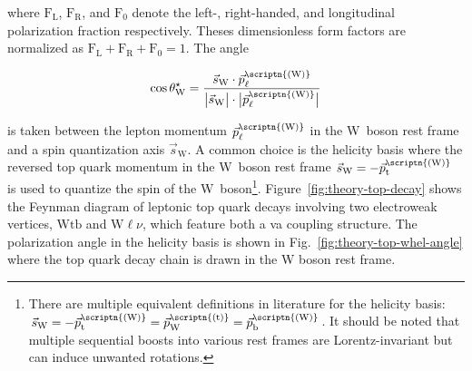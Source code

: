 where $\mathrm{F}_\mathrm{L}$, $\mathrm{F}_\mathrm{R}$, and $\mathrm{F}_{0}$ denote the left-, right-handed, and longitudinal polarization fraction respectively. Theses dimensionless form factors are normalized as $\mathrm{F}_\mathrm{L}+\mathrm{F}_\mathrm{R}+\mathrm{F}_{0}=1$. The angle 

\begin{equation}
\cos\theta^\star_\mathrm{W}=\frac{\vec{s}_\mathrm{W}\cdot\vec{p}_{\ell}^\scriptn{\mathrm{(W)}}}{\big|\vec{s}_\mathrm{W}\big|\cdot\big|\vec{p}_{\ell}^\scriptn{\mathrm{(W)}}\big|}
\end{equation}

is taken between the lepton momentum $\vec{p}_{\ell}^\scriptn{\mathrm{(W)}}$ in the W~boson rest frame and a spin quantization axis $\vec{s}_\mathrm{W}$. A common choice is the helicity basis where the reversed top quark momentum in the W~boson rest frame $\vec{s}_\mathrm{W}=-\vec{p}_\mathrm{t}^\scriptn{\mathrm{(W)}}$ is used to quantize the spin of the W~boson\footnote{There are multiple equivalent definitions in literature for the helicity basis: $\vec{s}_\mathrm{W}=-\vec{p}_\mathrm{t}^\scriptn{\mathrm{(W)}}=\vec{p}_\mathrm{W}^\scriptn{\mathrm{(t)}}=\vec{p}_\mathrm{b}^\scriptn{\mathrm{(W)}}$. It should be noted that multiple sequential boosts into various rest frames are Lorentz-invariant but can induce unwanted rotations.}. Figure~\ref{fig:theory-top-decay} shows the Feynman diagram of leptonic top quark decays involving two electroweak vertices, $\mathrm{Wtb}$ and $\mathrm{W}\ell\nu$, which feature both a \gls{va} coupling structure. The polarization angle in the helicity basis is shown in Fig.~\ref{fig:theory-top-whel-angle} where the top quark decay chain is drawn in the W boson rest frame.


